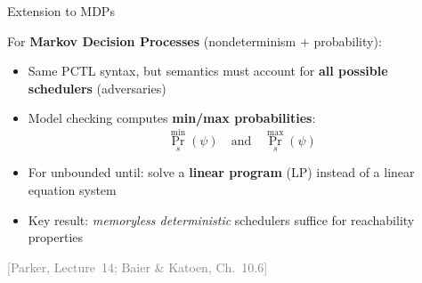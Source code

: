 \documentclass[dvipsnames]{beamer}
\begin{document}
\begin{frame}{Extension to MDPs}

    For \textbf{Markov Decision Processes} (nondeterminism + probability):

    \vspace{0.5em}

    \begin{itemize}
        \item Same PCTL syntax, but semantics must account for
              \textbf{all possible schedulers} (adversaries)

        \item Model checking computes \textbf{min/max probabilities}:
              \[
                  \Pr^{\min}_s(\psi) \quad\text{and}\quad \Pr^{\max}_s(\psi)
              \]

        \item For unbounded until: solve a \textbf{linear program} (LP)
              instead of a linear equation system

        \item Key result: \emph{memoryless deterministic} schedulers suffice
              for reachability properties
    \end{itemize}

    \vspace{1em}

    \hfill{\scriptsize\textcolor{gray}{[Parker, Lecture~14; Baier \& Katoen, Ch.~10.6]}}
\end{frame}



\end{document}
